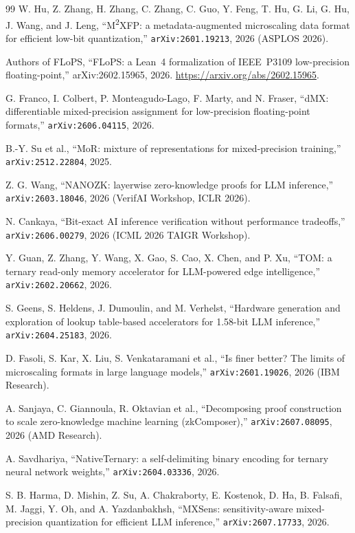 \documentclass[11pt,a4paper]{article}
\theoremstyle{plain}
\begin{document}
\begin{thebibliography}{99}
 W. Hu, Z. Zhang, H. Zhang, C. Zhang, C. Guo, Y. Feng,
T. Hu, G. Li, G. Hu, J. Wang, and J. Leng, ``M\textsuperscript{2}XFP: a
metadata-augmented microscaling data format for efficient low-bit
quantization,'' \texttt{arXiv:2601.19213}, 2026 (ASPLOS 2026).

 Authors of FLoPS, ``FLoPS: a Lean~4 formalization of
IEEE~P3109 low-precision floating-point,'' arXiv:2602.15965, 2026.
\url{https://arxiv.org/abs/2602.15965}.

 G. Franco, I. Colbert, P. Monteagudo-Lago, F. Marty, and
N. Fraser, ``dMX: differentiable mixed-precision assignment for low-precision
floating-point formats,'' \texttt{arXiv:2606.04115}, 2026.

 B.-Y. Su et al., ``MoR: mixture of representations for
mixed-precision training,'' \texttt{arXiv:2512.22804}, 2025.

 Z. G. Wang, ``NANOZK: layerwise zero-knowledge proofs for
LLM inference,'' \texttt{arXiv:2603.18046}, 2026 (VerifAI Workshop, ICLR 2026).

 N. Cankaya, ``Bit-exact AI inference verification
without performance tradeoffs,'' \texttt{arXiv:2606.00279}, 2026
(ICML 2026 TAIGR Workshop).

 Y. Guan, Z. Zhang, Y. Wang, X. Gao, S. Cao, X. Chen, and
P. Xu, ``TOM: a ternary read-only memory accelerator for LLM-powered edge
intelligence,'' \texttt{arXiv:2602.20662}, 2026.

 S. Geens, S. Heldens, J. Dumoulin, and M. Verhelst,
``Hardware generation and exploration of lookup table-based accelerators for
1.58-bit LLM inference,'' \texttt{arXiv:2604.25183}, 2026.

 D. Fasoli, S. Kar, X. Liu, S. Venkataramani et al.,
``Is finer better? The limits of microscaling formats in large language
models,'' \texttt{arXiv:2601.19026}, 2026 (IBM Research).

 A. Sanjaya, C. Giannoula, R. Oktavian et al.,
``Decomposing proof construction to scale zero-knowledge machine learning
(zkComposer),'' \texttt{arXiv:2607.08095}, 2026 (AMD Research).

 A. Savdhariya, ``NativeTernary: a self-delimiting
binary encoding for ternary neural network weights,'' \texttt{arXiv:2604.03336},
2026.

 S. B. Harma, D. Mishin, Z. Su, A. Chakraborty,
E. Kostenok, D. Ha, B. Falsafi, M. Jaggi, Y. Oh, and A. Yazdanbakhsh,
``MXSens: sensitivity-aware mixed-precision quantization for efficient LLM
inference,'' \texttt{arXiv:2607.17733}, 2026.


\end{thebibliography}
\end{document}
